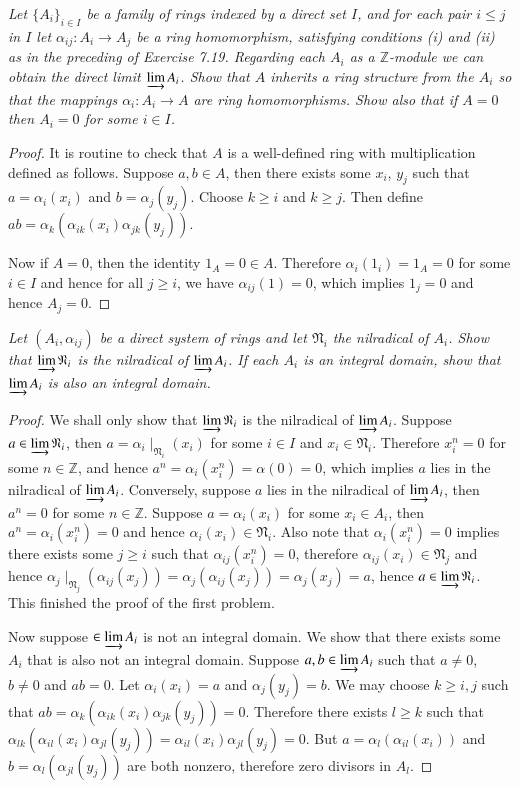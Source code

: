 \begin{problem}\em
Let $\{A_i\}_{i\in I}$ be a family of rings indexed by a direct set $I$, and for each pair $i\le j$ in $I$ let $\alpha_{ij}:A_i\to A_j$ be a ring homomorphism, satisfying conditions (i) and (ii) as in the preceding of Exercise 7.19. Regarding each $A_i$ as a $\mathbb{Z}$-module we can obtain the direct limit $\varinjlim A_i$. Show that $A$ inherits a ring structure from the $A_i$ so that the mappings $\alpha_i:A_i\to A$ are ring homomorphisms. Show also that if $A=0$ then $A_i=0$ for some $i\in I$.
\end{problem}
\begin{proof}
It is routine to check that $A$ is a well-defined ring with multiplication defined as follows. Suppose $a,b\in A$, then there exists some $x_i$, $y_j$ such that $a=\alpha_i(x_i)$ and $b=\alpha_j(y_j)$. Choose $k\ge i$ and $k\ge j$. Then define $ab=\alpha _k\left( \alpha _{ik}\left( x_i \right) \alpha _{jk}\left( y_j \right) \right) $.\par
Now if $A=0$, then the identity $1_A=0\in A$. Therefore $\alpha_i(1_i)=1_A=0$ for some $i\in I$ and hence for all $j\ge i$, we have $\alpha_{ij}(1)=0$, which implies $1_j=0$ and hence $A_j=0$.
\end{proof}
\begin{problem}\em
Let $(A_i,\alpha_{ij})$ be a direct system of rings and let $\mathfrak{N}_i$ the nilradical of $A_i$. Show that $\varinjlim\mathfrak{N}_i$ is the nilradical of $\varinjlim A_i$. If each $A_i$ is an integral domain, show that $\varinjlim A_i$ is also an integral domain.
\end{problem}
\begin{proof}
We shall only show that $\varinjlim\mathfrak{N}_i$ is the nilradical of $\varinjlim A_i$. Suppose $a\in\varinjlim\mathfrak{N}_i$, then $a=\alpha_i\mid_{\mathfrak{N}_i}(x_i)$ for some $i\in I$ and $x_i\in \mathfrak{N}_i$. Therefore $x_i^n=0$ for some $n\in\mathbb{Z}$, and hence $a^n=\alpha_i(x_i^n)=\alpha(0)=0$, which implies $a$ lies in the nilradical of $\varinjlim A_i$. Conversely, suppose $a$ lies in the nilradical of $\varinjlim A_i$, then $a^n=0$ for some $n\in\mathbb{Z}$. Suppose $a=\alpha_i(x_i)$ for some $x_i\in A_i$, then $a^n=\alpha_i(x_i^n)=0$ and hence $\alpha_i(x_i)\in\mathfrak{N}_i$. Also note that $\alpha_i(x_i^n)=0$ implies there exists some $j\ge i$ such that $\alpha_{ij}(x_i^n)=0$, therefore $\alpha_{ij}(x_i)\in\mathfrak{N}_j$ and hence $\alpha_j\mid_{\mathfrak{N}_j}(\alpha_{ij}(x_j))=\alpha_j(\alpha_{ij}(x_j))=\alpha_j(x_j)=a$, hence $a\in\varinjlim\mathfrak{N}_i$. This finished the proof of the first problem.\par
Now suppose $\in\varinjlim A_i$ is not an integral domain. We show that there exists some $A_i$ that is also not an integral domain. Suppose $a,b\in\varinjlim A_i$ such that $a\ne 0$, $b\ne 0$ and $ab=0$. Let $\alpha_i(x_i)=a$ and $\alpha_j(y_j)=b$. We may choose $k\ge i,j$ such that $ab=\alpha_k(\alpha_{ik}(x_i)\alpha_{jk}(y_j))=0$. Therefore there exists $l\ge k$ such that $\alpha_{lk}(\alpha_{il}(x_i)\alpha_{jl}(y_j))=\alpha_{il}(x_i)\alpha_{jl}(y_j)=0$. But $a=\alpha_l(\alpha_{il}(x_i))$ and $b=\alpha_l(\alpha_{jl}(y_j))$ are both nonzero, therefore zero divisors in $A_l$.
\end{proof}
